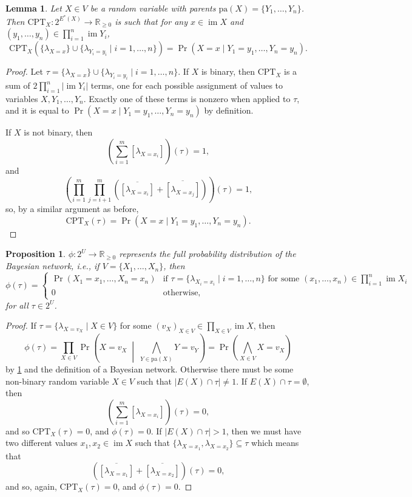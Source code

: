 \documentclass{article}
\newtheorem{lemma}{Lemma}
\newtheorem{proposition}{Proposition}
\theoremstyle{definition}
\theoremstyle{remark}
\DeclareMathOperator{\im}{im}
\begin{document}
\begin{lemma} \label{lemma:cpt}
  Let $X \in V$ be a random variable with parents $\mathrm{pa}(X) = \{ Y_1,
  \dots, Y_n \}$. Then $\mathrm{CPT}_X\colon 2^{E^*(X)} \to \mathbb{R}_{\ge 0}$
  is such that for any $x \in \im X$ and $(y_1, \dots, y_n) \in \prod_{i=1}^n
  \im Y_i$,
  \[
    \mathrm{CPT}_X (\{ \lambda_{X=x} \} \cup \{ \lambda_{Y_i=y_i} \mid i = 1,
    \dots, n \}) = \Pr(X = x \mid Y_1 = y_1, \dots, Y_n = y_n).
  \]
\end{lemma}
\begin{proof}
  Let $\tau = \{ \lambda_{X=x} \} \cup \{ \lambda_{Y_i=y_i} \mid i = 1, \dots, n
  \}$. If $X$ is binary, then $\mathrm{CPT}_X$ is a sum of $2\prod_{i=1}^n |\im
  Y_i|$ terms, one for each possible assignment of values to variables $X, Y_1,
  \dots, Y_n$. Exactly one of these terms is nonzero when applied to $\tau$, and
  it is equal to $\Pr(X = x \mid Y_1 = y_1, \dots, Y_n = y_n)$ by definition.

  If $X$ is not binary, then
  \[
    \left( \sum_{i=1}^m [\lambda_{X = x_i}] \right)(\tau) = 1,
  \]
  and
  \[
    \left( \prod_{i=1}^m \prod_{j=i+1}^m (\overline{[\lambda_{X = x_i}]} +
      \overline{[\lambda_{X = x_j}]}) \right)(\tau) = 1,
  \]
  so, by a similar argument as before,
  \[
    \mathrm{CPT}_X(\tau) = \Pr(X = x \mid Y_1 = y_1, \dots, Y_n = y_n).
  \]
\end{proof}

\begin{proposition} \label{lemma:full_distribution}
  $\phi\colon 2^U \to \mathbb{R}_{\ge 0}$ represents the full probability
  distribution of the Bayesian network, i.e., if $V = \{ X_1, \dots, X_n\}$,
  then
  \[
    \phi(\tau) =
    \begin{cases}
      \Pr(X_1 = x_1, \dots, X_n = x_n) & \text{if } \tau = \{ \lambda_{X_i=x_i}
      \mid i = 1, \dots, n \} \text{ for some } (x_1, \dots, x_n) \in
      \prod_{i=1}^n \im X_i \\
      0 & \text{otherwise,}
    \end{cases}
  \]
  for all $\tau \in 2^U$.
\end{proposition}
\begin{proof}
  If $\tau = \{ \lambda_{X=v_X} \mid X \in V \}$ for some $(v_X)_{X \in V} \in
  \prod_{X \in V} \im X$, then
  \[
    \phi(\tau) = \prod_{X \in V} \Pr \left( X=v_X \;\middle|\; \bigwedge_{Y \in
        \mathrm{pa}(X)} Y=v_Y \right) = \Pr \left( \bigwedge_{X \in V} X=v_X
    \right)
  \]
  by \cref{lemma:cpt} and the definition of a Bayesian network. Otherwise there
  must be some non-binary random variable $X \in V$ such that $|E(X) \cap \tau|
  \ne 1$. If $E(X) \cap \tau = \emptyset$, then
  \[
    \left( \sum_{i=1}^m [\lambda_{X = x_i}] \right)(\tau) = 0,
  \]
  and so $\mathrm{CPT}_X(\tau) = 0$, and $\phi(\tau) = 0$. If $|E(X) \cap
  \tau| > 1$, then we must have two different values $x_1, x_2 \in \im X$ such
  that $\{\lambda_{X=x_1}, \lambda_{X=x_2} \} \subseteq \tau$ which means that
  \[
    (\overline{[\lambda_{X=x_1}]} + \overline{[\lambda_{X=x_2}]})(\tau) = 0,
  \]
  and so, again, $\mathrm{CPT}_X(\tau) = 0$, and $\phi(\tau) = 0$.
\end{proof}
\end{document}
